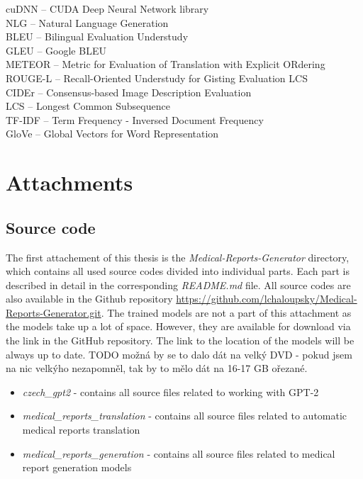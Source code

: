 \documentclass[12pt,a4paper]{report}
\begin{document}
cuDNN -- CUDA Deep Neural Network library\\
NLG -- Natural Language Generation\\
BLEU -- Bilingual Evaluation Understudy\\
GLEU -- Google BLEU\\
METEOR -- Metric for Evaluation of Translation with Explicit ORdering\\
ROUGE-L -- Recall-Oriented Understudy for Gisting Evaluation LCS\\
CIDEr -- Consensus-based Image Description Evaluation\\
LCS -- Longest Common Subsequence\\
TF-IDF -- Term Frequency - Inversed Document Frequency\\
GloVe -- Global Vectors for Word Representation

\appendix
\chapter{Attachments}

\section{Source code}
\label{add:Codes}
The first attachement of this thesis is the \textit{Medical-Reports-Generator} directory, which contains all used source codes divided into individual parts. Each part is described in detail in the corresponding \textit{README.md} file. All source codes are also available in the Github repository \url{https://github.com/lchaloupsky/Medical-Reports-Generator.git}. The trained models are not a part of this attachment as the models take up a lot of space. However, they are available for download via the link in the GitHub repository. The link to the location of the models will be always up to date. TODO možná by se to dalo dát na velký DVD - pokud jsem na nic velkýho nezapomněl, tak by to mělo dát na 16-17 GB ořezané.
\begin{itemize}
	\item \textit{czech\_gpt2} - contains all source files related to working with GPT-2
	\item \textit{medical\_reports\_translation} - contains all source files related to automatic medical reports translation
	\item \textit{medical\_reports\_generation} - contains all source files related to medical report generation models
\end{itemize}
\end{document}
